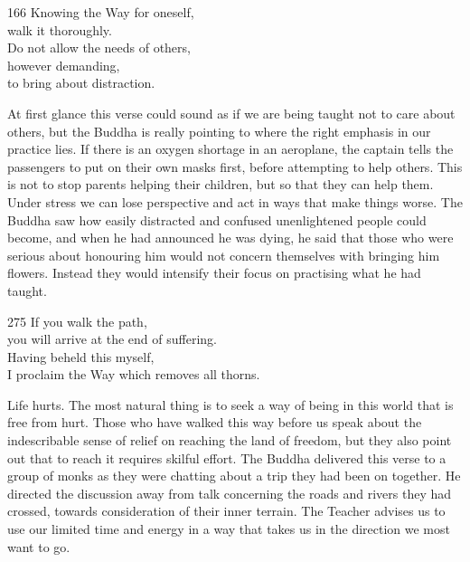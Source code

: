 
\begin{dhpVerse}{166}
\label{dhp-166}
Knowing the Way for oneself,\\
walk it thoroughly.\\
Do not allow the needs of others,\\
however demanding,\\
to bring about distraction.
\end{dhpVerse}

\begin{dhpRefl}
  At first glance this verse could sound as if we are being taught not to care
  about others, but the Buddha is really pointing to where the right emphasis in
  our practice lies. If there is an oxygen shortage in an aeroplane, the captain
  tells the passengers to put on their own masks first, before attempting to
  help others. This is not to stop parents helping their children, but so that
  they can help them. Under stress we can lose perspective and act in ways that
  make things worse. The Buddha saw how easily distracted and confused
  unenlightened people could become, and when he had announced he was dying, he
  said that those who were serious about honouring him would not concern
  themselves with bringing him flowers. Instead they would intensify their focus
  on practising what he had taught.
\end{dhpRefl}


\begin{dhpVerse}{275}
\label{dhp-275}
If you walk the path,\\
you will arrive at the end of suffering.\\
Having beheld this myself,\\
I proclaim the Way which removes all thorns.
\end{dhpVerse}

\begin{dhpRefl}
  Life hurts. The most natural thing is to seek a way of being in this world
  that is free from hurt. Those who have walked this way before us speak about
  the indescribable sense of relief on reaching the land of freedom, but they
  also point out that to reach it requires skilful effort. The Buddha delivered
  this verse to a group of monks as they were chatting about a trip they had
  been on together. He directed the discussion away from talk concerning the
  roads and rivers they had crossed, towards consideration of their inner
  terrain. The Teacher advises us to use our limited time and energy in a way
  that takes us in the direction we most want to go.
\end{dhpRefl}

